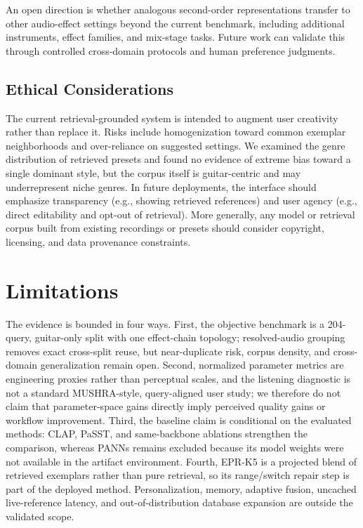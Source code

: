 An open direction is whether analogous second-order representations transfer to other audio-effect settings beyond the current benchmark, including additional instruments, effect families, and mix-stage tasks. Future work can validate this through controlled cross-domain protocols and human preference judgments.

\subsection{Ethical Considerations}

The current retrieval-grounded system is intended to augment user creativity rather than replace it. Risks include homogenization toward common exemplar neighborhoods and over-reliance on suggested settings. We examined the genre distribution of retrieved presets and found no evidence of extreme bias toward a single dominant style, but the corpus itself is guitar-centric and may underrepresent niche genres. In future deployments, the interface should emphasize transparency (e.g., showing retrieved references) and user agency (e.g., direct editability and opt-out of retrieval). More generally, any model or retrieval corpus built from existing recordings or presets should consider copyright, licensing, and data provenance constraints.

\section{Limitations}
\label{sec:limitations}

The evidence is bounded in four ways. First, the objective benchmark is a 204-query, guitar-only split with one effect-chain topology; resolved-audio grouping removes exact cross-split reuse, but near-duplicate risk, corpus density, and cross-domain generalization remain open. Second, normalized parameter metrics are engineering proxies rather than perceptual scales, and the listening diagnostic is not a standard MUSHRA-style, query-aligned user study; we therefore do not claim that parameter-space gains directly imply perceived quality gains or workflow improvement. Third, the baseline claim is conditional on the evaluated methods: CLAP, PaSST, and same-backbone ablations strengthen the comparison, whereas PANNs remains excluded because its model weights were not available in the artifact environment. Fourth, EPR-K5 is a projected blend of retrieved exemplars rather than pure retrieval, so its range/switch repair step is part of the deployed method. Personalization, memory, adaptive fusion, uncached live-reference latency, and out-of-distribution database expansion are outside the validated scope.

